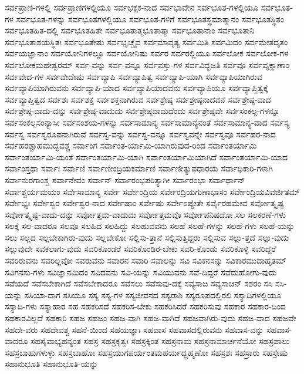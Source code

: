 {ಸರ್ವಪ್ರಾಣಿ-ಗಳಲ್ಲಿ
ಸರ್ವಪ್ರಾಣಿಗಳಲ್ಲಿಯೂ
ಸರ್ವಭಕ್ಷಕ-ನಾದ
ಸರ್ವಭಾವೇನ
ಸರ್ವಭೂತ-ಗಳಲ್ಲಿಯೂ
ಸರ್ವಭೂತ-ಗಳ
ಸರ್ವಭೂತ-ಗಳನ್ನು
ಸರ್ವಭೂತಗಳಲ್ಲಿಯೂ
ಸರ್ವಭೂತ-ಗಳಿಗೆ
ಸರ್ವಭೂತಸ್ಥಮಾತ್ಮಾನಂ
ಸರ್ವಭೂತಸ್ಥಿತಂ
ಸರ್ವಭೂತಹಿತ-ದಲ್ಲಿ
ಸರ್ವಭೂತಹಿತೇ
ಸರ್ವಭೂತಾತ್ಮಭೂತಾತ್ಮಾ
ಸರ್ವಭೂತಾನಾಂ
ಸರ್ವಭೂತಾನಿ
ಸರ್ವಭೂತಾಶಯಸ್ಥಿತಃ
ಸರ್ವಭೂತೇಷು
ಸರ್ವಭೃಚ್ಚೈವ
ಸರ್ವಮಾವೃತ್ಯ
ಸರ್ವಮಿತಿ
ಸರ್ವಮಿದಂ
ಸರ್ವಮೇತದೃತಂ
ಸರ್ವಯಜ್ಞಾನಾಂ
ಸರ್ವಯೋನಿಗಳಲ್ಲೂ
ಸರ್ವಯೋನಿಷು
ಸರ್ವರ
ಸರ್ವರಲ್ಲಿಯೂ
ಸರ್ವಲೋಕ
ಸರ್ವಲೋಕ-ಗಳ
ಸರ್ವಲೋಕಮಹೇಶ್ವರಮ್
ಸರ್ವ-ವನ್ನು
ಸರ್ವ-ವನ್ನೂ
ಸರ್ವವಸ್ತು-ಗಳ
ಸರ್ವವಿದ್ಭಜತಿ
ಸರ್ವವೂ
ಸರ್ವವೃಕ್ಷಾಣಾಂ
ಸರ್ವವೇದ-ಗಳ
ಸರ್ವವೇದೇಷು
ಸರ್ವವ್ಯಾಪಿ
ಸರ್ವವ್ಯಾಪಿತ್ವ
ಸರ್ವವ್ಯಾಪಿ-ಯಾಗಿ
ಸರ್ವವ್ಯಾಪಿಯಾಗಿರುವ
ಸರ್ವವ್ಯಾಪಿಯಾಗಿರುವನು
ಸರ್ವವ್ಯಾಪಿ-ಯಾದ
ಸರ್ವವ್ಯಾಪಿಯಾದವನು
ಸರ್ವವ್ಯಾಪಿಯೂ
ಸರ್ವವ್ಯಾಪ್ತಿತ್ವಕ್ಕೆ
ಸರ್ವವ್ಯಾಪ್ತಿತ್ವದ
ಸರ್ವಶಃ
ಸರ್ವಶಕ್ತ
ಸರ್ವಶಕ್ತನಾಗಿರುವ
ಸರ್ವಶ್ರೇಷ್ಠ
ಸರ್ವಶ್ರೇಷ್ಠನಾದವನೆ
ಸರ್ವಶ್ರೇಷ್ಠ-ವಾದ
ಸರ್ವಶ್ರೇಷ್ಠ-ವಾದು-ದನ್ನು
ಸರ್ವಶ್ರೇಷ್ಠ-ವಾದುದು
ಸರ್ವಶ್ರೇಷ್ಠವಾದುದೆಂದು
ಸರ್ವಶ್ರೇಷ್ಠವೇ
ಸರ್ವಸಂಕಲ್ಪ-ಗಳನ್ನೂ
ಸರ್ವಸಂಕಲ್ಪಸಂನ್ಯಾಸೀ
ಸರ್ವಸಂಶಯ-ಗಳನ್ನು
ಸರ್ವಸಾಮಾನ್ಯ
ಸರ್ವಸಾಮಾನ್ಯನಂತೆ
ಸರ್ವಸಾಮಾನ್ಯ-ವಾದ
ಸರ್ವಸ್ಯ
ಸರ್ವಸ್ವ
ಸರ್ವಸ್ವರೂಪನಾಗಿರುವೆ
ಸರ್ವಸ್ವ-ವನ್ನು
ಸರ್ವಸ್ವ-ವನ್ನೂ
ಸರ್ವಸ್ವವನ್ನೇ
ಸರ್ವಸ್ವವೂ
ಸರ್ವಹರ-ನಾದ
ಸರ್ವಹರಶ್ಚಾಹಮುದ್ಭವಶ್ಚ
ಸರ್ವಾಂಗ
ಸರ್ವಾಂತ-ರ್ಯಾಮಿ-ಯಾಗಿರುವುದ-ರಿಂದ
ಸರ್ವಾಂತರ್ಯಾಮಿ
ಸರ್ವಾಂತರ್ಯಾಮಿ-ಯಂತೆ
ಸರ್ವಾಂತರ್ಯಾಮಿ-ಯಾಗಿ
ಸರ್ವಾಂತರ್ಯಾಮಿಯಾಗಿದೆ
ಸರ್ವಾಂತರ್ಯಾಮಿ-ಯಾದ
ಸರ್ವಾಂಸ್ತಥಾ
ಸರ್ವಾಃ
ಸರ್ವಾಣಿ
ಸರ್ವಾಣೀಂದ್ರಿಯಕರ್ಮಾಣಿ
ಸರ್ವಾಣೀತ್ಯುಪಧಾರಯ
ಸರ್ವಾಧಿಕಾರಿ-ಗಳಾಗಿ
ಸರ್ವಾನುರಗಾಂಶ್ಚ
ಸರ್ವಾನೇವಂ
ಸರ್ವಾನ್
ಸರ್ವಾರಂಭಪರಿತ್ಯಾಗೀ
ಸರ್ವಾರಂಭಾ
ಸರ್ವಾರ್ಥಾನ್
ಸರ್ವಾಶ್ಚರ್ಯಮಯಂ
ಸರ್ವೆಸಾಮಾನ್ಯ
ಸರ್ವೇ
ಸರ್ವೇಂದ್ರಿಯ
ಸರ್ವೇಂದ್ರಿಯಗುಣಾಭಾಸಂ
ಸರ್ವೇಂದ್ರಿಯವಿವರ್ಜಿತಮ್
ಸರ್ವೇಭ್ಯಃ
ಸರ್ವೇಶ್ವರ
ಸರ್ವೇಶ್ವರ-ನಾದ
ಸರ್ವೇಷಾಂ
ಸರ್ವೇಷು
ಸರ್ವೇಽಪ್ಯೇತೇ
ಸರ್ವೈರಹಮೇವ
ಸರ್ವೋತ್ಕೃಷ್ಟ
ಸರ್ವೋತ್ಕೃಷ್ಟ-ವಾದು-ದನ್ನು
ಸರ್ವೋತ್ತಮ-ವಾದುದು
ಸರ್ವೋತ್ತಮವೊ
ಸರ್ವೋಪನಿಷದೋ
ಸಲ
ಸಲಕರಣೆ-ಗಳು
ಸಲಕ್ಕೆ
ಸಲ-ವಾದರೂ
ಸಲವೂ
ಸಲಹಿದ
ಸಲಹಿದ್ದು
ಸಲಹುವವನು
ಸಲಹೆ
ಸಲಹೆ-ಗಳನ್ನು
ಸಲಹೆ-ಗಳು
ಸಲಹೆ-ಯನ್ನು
ಸಲು
ಸಲ್ಲದ
ಸಲ್ಲಬೇಕಾಗಿರು-ವುದು
ಸಲ್ಲಬೇಕೋ
ಸಲ್ಲಿಸು-ತ್ತಾನೆ
ಸಲ್ಲಿಸುತ್ತಿದ್ದರು
ಸಲ್ಲಿಸುವ
ಸಲ್ಲು-ತ್ತದೆ
ಸಲ್ಲು-ವುದು
ಸಲ್ಲುವುದೇ
ಸವಕಲಾಗು-ವುದು
ಸವರಿಕೊಂಡರೆ
ಸವರಿಕೊಂಡಿರ-ಬೇಕು
ಸವರಿ-ಕೊಂಡು
ಸವರಿಕೊಳ್ಳಿ
ಸವರಿದ್ದರೆ
ಸವರಿರುವನು
ಸವರಿಲ್ಲವೋ
ಸವರುವನು
ಸವಾರನ
ಸವಾರಿ
ಸವಾಲನ್ನು
ಸವಿ
ಸವಿಕನಸನ್ನು
ಸವಿಕಾರಮುದಾಹೃತಮ್
ಸವಿಗನಸು-ಗಳು
ಸವಿಜ್ಞಾನಮಿದಂ
ಸವಿದವನು
ಸವಿ-ಯನ್ನು
ಸವಿಯುವನು
ಸವೆ-ದಿದ್ದರೆ
ಸವೆದುಹೋಗು-ವುದು
ಸವೆಯದೆ
ಸವೆಸಬೇಕಾಗಿದೆ
ಸವೆಸಬೇಕಾದರೂ
ಸವೆಸಲು
ಸವೆಸುವು-ದಕ್ಕೆ
ಸವ್ಯಸಾಚಿ
ಸವ್ಯಸಾಚಿನ್
ಸಶರಂ
ಸಸಿ
ಸಸಿ-ಯನ್ನು
ಸಸಿಯಾ-ದಾಗ
ಸಸಿಯೂ
ಸಸ್ಯ
ಸಸ್ಯ-ಗಳ
ಸಸ್ಯಜೀವನದ
ಸಸ್ಯರಾಶಿ
ಸಸ್ಯರೂಪದಲ್ಲಿರಲಿ
ಸಸ್ಯಾದಿಗಳಲ್ಲಿಯೂ
ಸಸ್ಯಾದಿ-ಗಳು
ಸಸ್ಯಾಹಾರ
ಸಹ
ಸಹಕರಿಸದೆ
ಸಹಕರಿಸ-ಬೇಕು
ಸಹಕರಿಸಿದರೆ
ಸಹಕರಿಸುವು
ಸಹಕಾರ
ಸಹಕಾರ-ದಿಂದ
ಸಹಕಾರವಿಲ್ಲದೆ
ಸಹಕಾರಿ
ಸಹಜ
ಸಹಜಂ
ಸಹಜ-ವಾಗಿ
ಸಹಜ-ವಾಗಿದೆ
ಸಹಜವಾಗಿರು-ವುದು
ಸಹಜ-ವಾದ
ಸಹಜವೇ
ಸಹದೇ-ವರು
ಸಹದೇವಶ್ಚ
ಸಹನೆ-ಯಿಂದ
ಸಹಯಜ್ಞಾಃ
ಸಹವಾಸ
ಸಹವಾಸದಲ್ಲಿರುವನು
ಸಹವಾಸ-ವನ್ನು
ಸಹವಾಸ-ವಾದರೂ
ಸಹಸೈವಾಭ್ಯಹನ್ಯಂತ
ಸಹಸ್ರ
ಸಹಸ್ರಕೃತ್ವಃ
ಸಹಸ್ರಕ್ಕಿಂತ
ಸಹಸ್ರನಾಮ
ಸಹಸ್ರನಾಮಾರ್ಚನೆಯೋ
ಸಹಸ್ರಪಾಲು
ಸಹಸ್ರಬಾಹುಗಳುಳ್ಳು
ಸಹಸ್ರಬಾಹೋ
ಸಹಸ್ರಯುಗಪರ್ಯಂತಮಹರ್ಯದ್ಬ್ರಹ್ಮಣೋ
ಸಹಸ್ರಶಃ
ಸಹಸ್ರಾರು
ಸಹಸ್ರೇಷು
ಸಹಾನುಭೂತಿ
ಸಹಾನುಭೂತಿ-ಯನ್ನು
}
